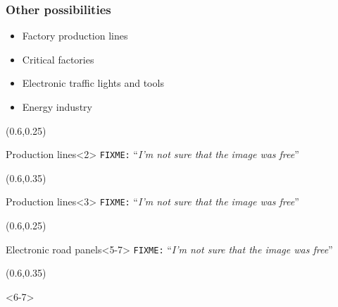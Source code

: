 \documentclass{beamer}
\newcommand{\fixme}[1]{\texttt{\color{red}FIXME:} ``\emph{#1}''}
\begin{document}
\begin{frame}
\frametitle{Other possibilities}
    \begin{itemize}
        \item<2-> Factory production lines
        \item<3-> Critical factories
        \item<4-|alert@4-7> Electronic traffic lights and tools
        \item<8-|alert@8> Energy industry
    \end{itemize}
    \begin{textblock*}{50mm}(0.6\textwidth,0.25\textheight)
        \begin{exampleblock}{Production lines}<2>
              \small{\fixme{I'm not sure that the image was free}}
        \end{exampleblock}
    \end{textblock*}
    \begin{textblock*}{50mm}(0.6\textwidth,0.35\textheight)
        \begin{exampleblock}{Production lines}<3>
              \small{\fixme{I'm not sure that the image was free}}
        \end{exampleblock}
    \end{textblock*}
    \begin{textblock*}{50mm}(0.6\textwidth,0.25\textheight)
        \begin{exampleblock}{Electronic road panels}<5-7>
              \small{\fixme{I'm not sure that the image was free}}
        \end{exampleblock}
    \end{textblock*}
    \begin{textblock*}{50mm}(0.6\textwidth,0.35\textheight)
        \begin{exampleblock}{}<6-7>

\end{exampleblock}
\end{textblock*}
\end{frame}
\end{document}
